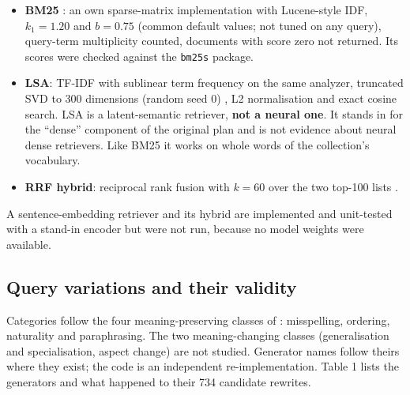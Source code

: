 \documentclass[
  11pt,
]{article}
\providecommand{\tightlist}{%
  \setlength{\itemsep}{0pt}\setlength{\parskip}{0pt}}
\begin{document}
\begin{itemize}
\tightlist
\item
  \textbf{BM25} \citep{robertson2009}: an own sparse-matrix
  implementation with Lucene-style IDF, \(k_1 = 1.20\) and \(b = 0.75\)
  (common default values; not tuned on any query), query-term
  multiplicity counted, documents with score zero not returned. Its
  scores were checked against the \texttt{bm25s} package.
\item
  \textbf{LSA}: TF-IDF with sublinear term frequency on the same
  analyzer, truncated SVD to 300 dimensions (random seed 0)
  \citep{deerwester1990}, L2 normalisation and exact cosine search. LSA
  is a latent-semantic retriever, \textbf{not a neural one}. It stands
  in for the ``dense'' component of the original plan and is not
  evidence about neural dense retrievers. Like BM25 it works on whole
  words of the collection's vocabulary.
\item
  \textbf{RRF hybrid}: reciprocal rank fusion with \(k = 60\) over the
  two top-100 lists \citep{cormack2009}.
\end{itemize}

A sentence-embedding retriever and its hybrid are implemented and
unit-tested with a stand-in encoder but were not run, because no model
weights were available.

\hypertarget{query-variations-and-their-validity}{%
\subsection{Query variations and their
validity}\label{query-variations-and-their-validity}}

Categories follow the four meaning-preserving classes of
\citet{penha2022}: misspelling, ordering, naturality and paraphrasing.
The two meaning-changing classes (generalisation and specialisation,
aspect change) are not studied. Generator names follow theirs where they
exist; the code is an independent re-implementation. Table 1 lists the
generators and what happened to their 734 candidate rewrites.
\end{document}
